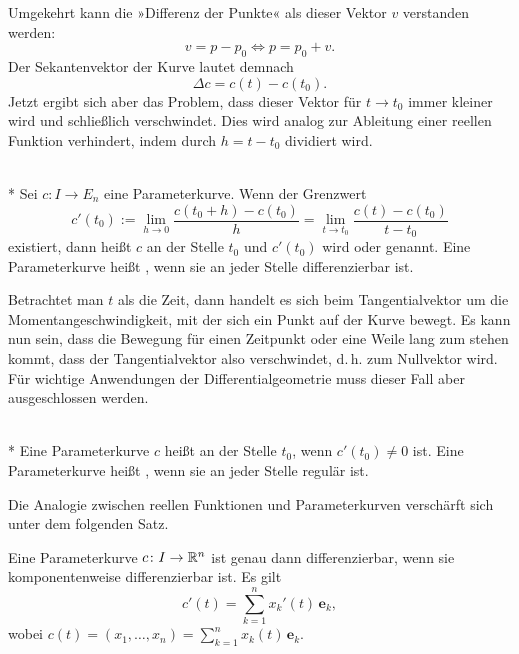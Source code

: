 Umgekehrt kann die »Differenz der Punkte« als dieser Vektor $v$
verstanden werden:%
\begin{equation}
v = p-p_0 \iff p = p_0+v.
\end{equation}
Der Sekantenvektor der Kurve lautet demnach
\begin{equation}
\Delta c = c(t)-c(t_0).
\end{equation}
Jetzt ergibt sich aber das Problem, dass dieser Vektor für $t\to t_0$
immer kleiner wird und schließlich verschwindet. Dies wird analog
zur Ableitung einer reellen Funktion verhindert, indem durch $h=t-t_0$
dividiert wird.
\begin{definition}%
\label{diff-Parameterkurve}\mbox{}\\*
Sei $c\colon I\to E_n$ eine Parameterkurve. Wenn der Grenzwert
\begin{equation}
c'(t_0) := \lim_{h\to 0} \frac{c(t_0+h)-c(t_0)}{h}
= \lim_{t\to t_0} \frac{c(t)-c(t_0)}{t-t_0}
\end{equation}
existiert, dann heißt $c$ an der Stelle $t_0$
 und $c'(t_0)$ wird 
oder  genannt. Eine Parameterkurve heißt
, wenn sie an jeder Stelle differenzierbar ist.
\end{definition}
Betrachtet man $t$ als die Zeit, dann handelt es sich beim
Tangentialvektor um die Momentangeschwindigkeit, mit der sich ein
Punkt auf der Kurve bewegt. Es kann nun sein, dass die Bewegung für
einen Zeitpunkt oder eine Weile lang zum stehen kommt, dass der
Tangentialvektor also verschwindet, d.\,h. zum Nullvektor wird.
Für wichtige Anwendungen der Differentialgeometrie muss dieser
Fall aber ausgeschlossen werden.
\begin{definition}\mbox{}\\*
Eine Parameterkurve $c$ heißt  an der Stelle $t_0$,
wenn $c'(t_0)\ne 0$ ist. Eine Parameterkurve heißt ,
wenn sie an jeder Stelle regulär ist.
\end{definition}

\noindent
Die Analogie zwischen reellen Funktionen und Parameterkurven
verschärft sich unter dem folgenden Satz.

\begin{theorem}
Eine Parameterkurve $c\colon I\to\mathbb R^n$ ist genau dann
differenzierbar, wenn sie komponentenweise differenzierbar
ist. Es gilt
\begin{equation}
c'(t) = \sum_{k=1}^n x_k'(t)\,\mathbf e_k,
\end{equation}
wobei $c(t)=(x_1,\ldots,x_n)=\sum_{k=1}^n x_k(t)\,\mathbf e_k$.
\end{theorem}

